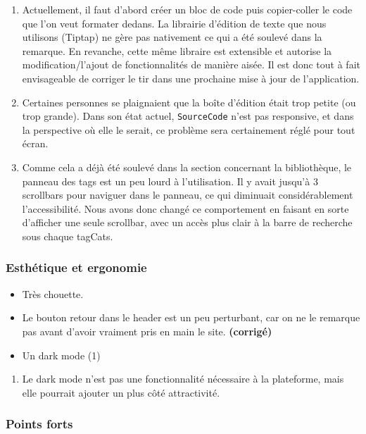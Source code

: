 \bigskip
\begin{enumerate}
    \item Actuellement, il faut d'abord créer un bloc de code puis copier-coller le code que l'on veut formater dedans. La librairie d'édition de texte que nous utilisons (Tiptap) ne gère pas nativement ce qui a été soulevé dans la remarque. En revanche, cette même libraire est extensible et autorise la modification/l'ajout de fonctionnalités de manière aisée. Il est donc tout à fait envisageable de corriger le tir dans une prochaine mise à jour de l'application.
    \item Certaines personnes se plaignaient que la boîte d'édition était trop petite (ou trop grande). Dans son état actuel, \texttt{SourceCode} n'est pas responsive, et dans la perspective où elle le serait, ce problème sera certainement réglé pour tout écran.
    \item Comme cela a déjà été soulevé dans la section concernant la bibliothèque, le panneau des \glspl{tag} est un peu lourd à l'utilisation. Il y avait jusqu'à 3 scrollbars pour naviguer dans le panneau, ce qui diminuait considérablement l'accessibilité. Nous avons donc changé ce comportement en faisant en sorte d'afficher une seule scrollbar, avec un accès plus clair à la barre de recherche sous chaque \glspl{tagCat}.
\end{enumerate}

\subsubsection*{Esthétique et ergonomie}

\begin{itemize}
    \item Très chouette.
    \item Le bouton retour dans le header est un peu perturbant, car on ne le remarque pas avant d'avoir vraiment pris en main le site. \textbf{(corrigé)}
    \item Un dark mode (1)
\end{itemize}
\bigskip
\begin{enumerate}
    \item Le dark mode n'est pas une fonctionnalité nécessaire à la plateforme, mais elle pourrait ajouter un plus côté attractivité.
\end{enumerate}

\subsubsection*{Points forts}

